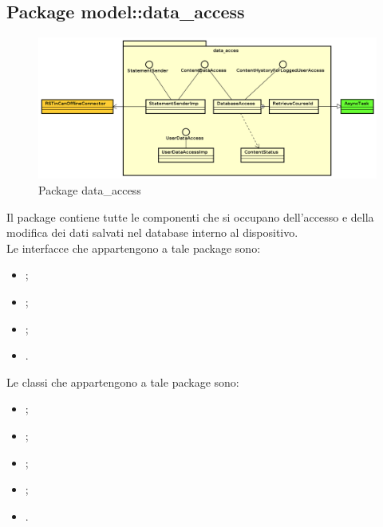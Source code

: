 \documentclass[../Tesi.tex]{subfiles}
\begin{document}
	\subsection{Package model::data\_access}
		\begin{figure}[H]
			\centering
			\includegraphics[scale=0.4]{images/package_diagrams/data_access}
				\caption{Package data\_access}
		\end{figure}
		Il package  contiene tutte le componenti che si occupano dell'accesso e della modifica dei dati salvati nel database interno al dispositivo. \\
		Le interfacce che appartengono a tale package sono:
		\begin{itemize}
			\item {};
			\item {};
			\item {};
			\item {}.
		\end{itemize}
		Le classi che appartengono a tale package sono:
		\begin{itemize}
			\item {};
			\item {};
			\item {};
			\item {};
			\item {}.
		\end{itemize}
\end{document}
